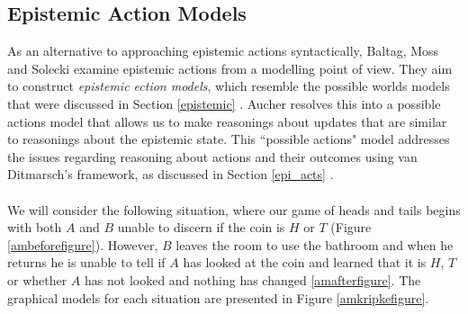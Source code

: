 \documentclass[12pt, a4paper, titlepage]{scrartcl}
\begin{document}
\subsection{Epistemic Action Models} \label{act_mods}
As an alternative to approaching epistemic actions syntactically, Baltag, Moss
and Solecki examine epistemic actions from a modelling point of view.
They aim to construct {\em epistemic ection models}, which resemble the possible 
worlds models that were discussed in Section \ref{epistemic}
\cite{baltag1998lpa}.
Aucher resolves this into a possible actions model that allows us to make
reasonings about updates that are similar to reasonings about the epistemic
state.
This ``possible actions" model addresses the issues regarding reasoning about
actions and their outcomes using van Ditmarsch's framework, as discussed in
Section \ref{epi_acts} \cite{hoek2008dynamic}.\\
\\
We will consider the following situation, where our game of heads and tails
begins with both $A$ and $B$ unable to discern if the coin is $H$ or $T$ (Figure
\ref{ambeforefigure}).
However, $B$ leaves the room to use the bathroom and when he returns he is unable
to tell if $A$ has looked at the coin and learned that it is $H$, $T$ or whether
$A$ has not looked and nothing has changed \ref{amafterfigure}.
The graphical models for each situation are presented in Figure
\ref{amkripkefigure}.\\
\end{document}
